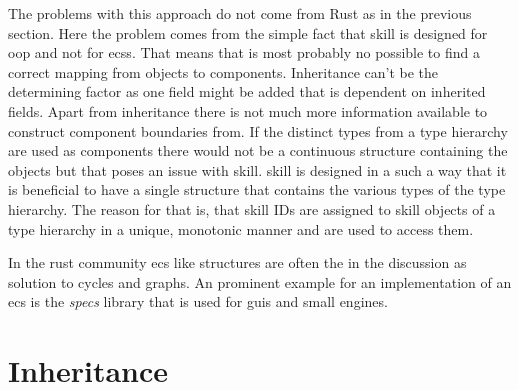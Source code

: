 \documentclass[thesis]{subfiles}
\begin{document}
    The problems with this approach do not come from Rust as in the previous section.
    Here the problem comes from the simple fact that \gls{skill} is designed for \gls{oop} and not for \glspl{ecs}.
    That means that is most probably no possible to find a correct mapping from objects to components.
    Inheritance can't be the determining factor as one field might be added that is dependent on inherited fields.
    Apart from inheritance there is not much more information available to construct component boundaries from.
    If the distinct types from a type hierarchy are used as components there would not be a continuous structure containing the objects but that poses an issue with \gls{skill}.
    \gls{skill} is designed in a such a way that it is beneficial to have a single structure that contains the various types of the type hierarchy.
    The reason for that is, that \gls{skill} IDs are assigned to \gls{skill} objects of a type hierarchy in a unique, monotonic manner and are used to access them.\autocite{skill-tr}

    In the rust community \gls{ecs} like structures are often the in the discussion as solution to cycles and graphs\autocites{rust-graph-r4cpp}{rust-graph-leipzig}{rust-graph-niko}{rust-graph-exyr}.
    An prominent example for an implementation of an \gls{ecs} is the \emph{specs}\autocite{rust-specs} library that is used for \glspl{gui}\autocite{rust-xi} and small engines\autocites{rust-amethyst}{rust-rhusics}.

\section{Inheritance}\label{sec:inheritance}
  \newsavebox{\inheritanceJava}
  \begin{lrbox}{\inheritanceJava}%
    \begin{minipage}{.25\linewidth}
      
    \end{minipage}
  \end{lrbox}
\end{document}
